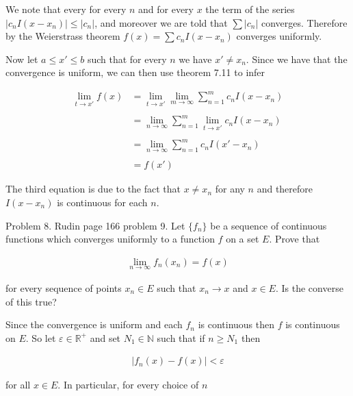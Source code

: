 \documentclass{article}
\begin{document}
  \vspace{1cm}

  We note that every for every $n$ and for every $x$ the term of the series $
  |c_nI(x-x_n)|\leq |c_n|$, and moreover we are told that $\sum |c_n|$ converges.  Therefore by the Weierstrass theorem $f(x)=\sum c_n I(x-x_n)$ converges uniformly.  

  Now let $a\le x'\le b$ such that for every $n$ we have $x'\ne x_n$.  Since we have that the convergence is uniform, we can then use theorem 7.11 to infer 

  \begin{align*}
    \lim_{t\to x'}f(x) &= \lim_{t\to x'}\lim_{m\to \infty}\sum_{n=1}^m c_nI(x-x_n) \\\\
    &= \lim_{n\to\infty}\sum_{n=1}^m\lim_{t\to x'}c_nI(x-x_n) \\\\
    &= \lim_{n\to\infty}\sum_{n=1}^mc_n I(x'-x_n)\\\\
    &= f(x')
  \end{align*}

  The third equation is due to the fact that $x\ne x_n$ for any $n$ and therefore $I(x-x_n)$ is continuous for each $n$.

  \vspace{1cm}

  \pagebreak

  {\Large \color{Sepia} Problem 8. Rudin page 166 problem 9.  Let $\{f_n\}$ be a sequence of continuous functions which converges uniformly to a function $f$ on a set $E$.  Prove that 
  
  \begin{align*}
    \lim_{n\to \infty} f_n(x_n)=f(x)
  \end{align*}

  for every sequence of points $x_n\in E$ such that $x_n\to x$ and $x\in E$.  Is the converse of this true?
  }

  \vspace{1cm}

  Since the convergence is uniform and each $f_n$ is continuous then $f$ is continuous on $E$.  So let $\varepsilon\in \mathbb R^+$ and set $N_1\in\mathbb N$ such that if $n\geq N_1$ then 

  \begin{align*}
    |f_n(x)-f(x)|<\varepsilon
  \end{align*}

  for all $x\in E$.  In particular, for every choice of $n$ 
  
\end{document}
